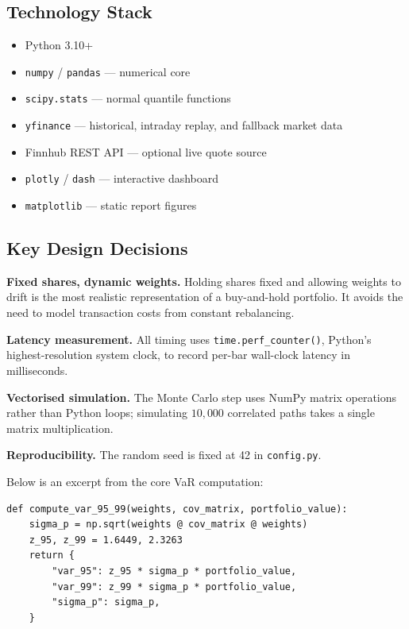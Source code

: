 \documentclass[12pt, a4paper]{article}
\begin{document}
\subsection{Technology Stack}

\begin{itemize}
  \item Python 3.10+
  \item \texttt{numpy} / \texttt{pandas} — numerical core
  \item \texttt{scipy.stats} — normal quantile functions
  \item \texttt{yfinance} — historical, intraday replay, and fallback market data
  \item Finnhub REST API — optional live quote source
  \item \texttt{plotly} / \texttt{dash} — interactive dashboard
  \item \texttt{matplotlib} — static report figures
\end{itemize}

\subsection{Key Design Decisions}

\textbf{Fixed shares, dynamic weights.}  Holding shares fixed and allowing
weights to drift is the most realistic representation of a buy-and-hold
portfolio.  It avoids the need to model transaction costs from constant
rebalancing.

\textbf{Latency measurement.}  All timing uses \texttt{time.perf\_counter()},
Python's highest-resolution system clock, to record per-bar wall-clock
latency in milliseconds.

\textbf{Vectorised simulation.}  The Monte Carlo step uses NumPy matrix
operations rather than Python loops; simulating $10{,}000$ correlated
paths takes a single matrix multiplication.

\textbf{Reproducibility.}  The random seed is fixed at 42 in \texttt{config.py}.

Below is an excerpt from the core VaR computation:

\begin{lstlisting}[style=python, caption={Parametric VaR core function.}]
def compute_var_95_99(weights, cov_matrix, portfolio_value):
    sigma_p = np.sqrt(weights @ cov_matrix @ weights)
    z_95, z_99 = 1.6449, 2.3263
    return {
        "var_95": z_95 * sigma_p * portfolio_value,
        "var_99": z_99 * sigma_p * portfolio_value,
        "sigma_p": sigma_p,
    }
\end{lstlisting}
\end{document}

